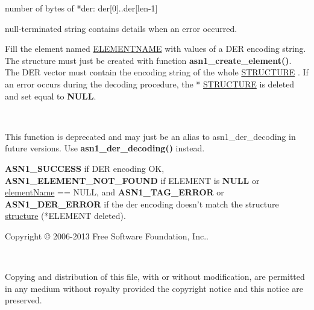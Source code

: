 \documentclass[]{article}
\let\realtextbf=\textbf
\renewcommand{\textbf}[1]{\textcolor{boldcolor}{\realtextbf{#1}}}
\renewcommand{\emph}[1]{\underline{#1}}
\begin{document}
\begin{description}
\itemsep1pt\parskip0pt
\item[int len]
number of bytes of *der: der{[}0{]}..der{[}len-1{]}
\end{description}

\begin{description}
\itemsep1pt\parskip0pt
\item[char * errorDescription]
null-terminated string contains details when an error occurred.
\end{description}


Fill the element named \emph{ELEMENTNAME} with values of a DER encoding
string. The structure must just be created with function
\textbf{asn1\_create\_element()}. The DER vector must contain the
encoding string of the whole \emph{STRUCTURE} . If an error occurs
during the decoding procedure, the * \emph{STRUCTURE} is deleted and set
equal to \textbf{NULL}.

~

This function is deprecated and may just be an alias to
asn1\_der\_decoding in future versions. Use
\textbf{asn1\_der\_decoding()} instead.


\textbf{ASN1\_SUCCESS} if DER encoding OK,
\textbf{ASN1\_ELEMENT\_NOT\_FOUND} if ELEMENT is \textbf{NULL} or
\emph{elementName} == NULL, and \textbf{ASN1\_TAG\_ERROR} or
\textbf{ASN1\_DER\_ERROR} if the der encoding doesn't match the
structure \emph{structure} (*ELEMENT deleted).


Copyright © 2006-2013 Free Software Foundation, Inc..

~

Copying and distribution of this file, with or without modification, are
permitted in any medium without royalty provided the copyright notice
and this notice are preserved.
\end{document}
